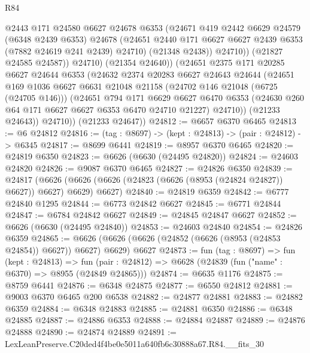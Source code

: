 \begin{lexlean}{R84}
\begin{coremodule}
                  @2443
                  @171
                  @24580
                  @6627
                  @24678
                  @6353
                  (@24671
                    @419
                    @2442
                    @6629
                    @24579
                    (@6348 @2439 @6353)
                    @24678
                    (@24651 @2440 @171 @6627 @6627 @2439 @6353 (@7882 @24619 @241 @2439) @24710)
                    (@21348 @2438))
                  @24710))
              (@21827 @24585 @24587))
            @24710)
          (@21354 @24640))
        (@24651
          @2375
          @171
          @20285
          @6627
          @24644
          @6353
          (@24632
            @2374
            @20283
            @6627
            @24643
            @24644
            (@24651
              @169
              @1036
              @6627
              @6631
              @21048
              @21158
              (@24702 @146 @21048 (@6725 (@24705 @146)))
              (@24651
                @794
                @171
                @6629
                @6627
                @6470
                @6353
                (@24630 @260 @64 @171 @6627 @6627 @6353 @6470 @24710 @21227)
                @24710))
            (@21233 @24643))
          @24710))
      (@21233 @24647))
@24812 := @6657 @6370 @6465
@24813 := @6 @24812
@24816 := (tag : @8697) -> (kept : @24813) -> (pair : @24812) -> @6345
@24817 := @8699 @6441
@24819 := @8957 @6370 @6465
@24820 := @24819 @6350
@24823 := @6626 (@6630 (@24495 @24820))
@24824 := @24603 @24820
@24826 := @9087 @6370 @6465
@24827 := @24826 @6350
@24839 := @24817
    (@6626 (@6626 (@6626 (@24823 (@6626 (@8953 (@24824 @24827)) @6627)) @6627) @6629) @6627)
@24840 := @24819 @6359
@24842 := @6777 @24840 @1295
@24844 := @6773 @24842 @6627
@24845 := @6771 @24844
@24847 := @6784 @24842 @6627
@24849 := @24845 @24847 @6627
@24852 := @6626 (@6630 (@24495 @24840))
@24853 := @24603 @24840
@24854 := @24826 @6359
@24865 := @6626 (@6626 (@6626 (@24852 (@6626 (@8953 (@24853 @24854)) @6627)) @6627) @6629) @6627
@24873 := fun (tag : @8697) =>
  fun (kept : @24813) =>
  fun (pair : @24812) => @6628 (@24839 (fun ("name" : @6370) => @8955 (@24849 @24865)))
@24874 := @6635 @1176
@24875 := @8759 @6441
@24876 := @6348 @24875
@24877 := @6550 @24812
@24881 := @9003 @6370 @6465 @200 @6538
@24882 := @24877 @24881
@24883 := @24882 @6359
@24884 := @6348 @24883
@24885 := @24881 @6350
@24886 := @6348 @24885
@24887 := @24886 @6353
@24888 := @24884 @24887
@24889 := @24876 @24888
@24890 := @24874 @24889
@24891 := LexLeanPreserve.C20ded4f4be0e5011a640fb6c30888a67.R84.__fits_30

\end{coremodule}
\end{lexlean}
